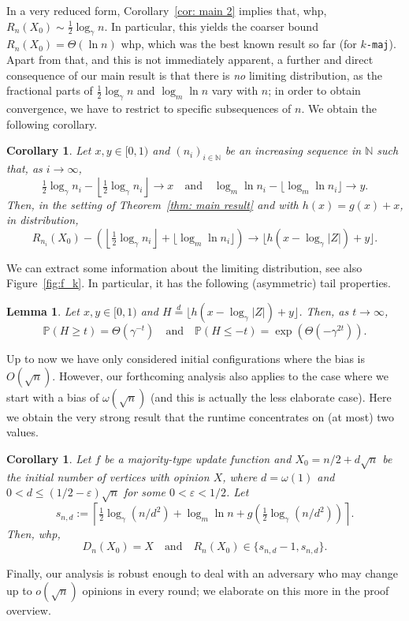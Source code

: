 \documentclass[11pt]{article}
\newcommand{\Prob}{\mathbb{P}}
\numberwithin{theorem}{section}
\newtheorem{corollary}[theorem]{Corollary}
\newtheorem{lemma}[theorem]{Lemma}
\begin{document}
In a very reduced form, Corollary~\ref{cor: main 2} implies that, whp, $R_n(X_0) \sim \frac12\log_\gamma n$.
In particular, this yields the coarser bound $R_n(X_0) =\Theta(\ln n)$ whp, which was the best known result so far (for \texttt{$k$-maj}).
Apart from that, and this is not immediately apparent, a further and direct consequence of our main result is that there is \emph{no} limiting distribution, as the fractional parts of $\frac{1}{2}\log_\gamma n$ and $\log_m\ln n$ vary with $n$;
in order to obtain convergence, we have to restrict to specific subsequences of $n$.
We obtain the following corollary.
\begin{corollary}\label{cor: main 1}
Let $x,y\in[0,1)$ and $(n_i)_{i\in\mathbb{N}}$ be an increasing sequence in $\mathbb{N}$ such that, as $i\to\infty$,
\[
    \tfrac{1}{2}\log_\gamma n_i -\left\lfloor\tfrac{1}{2}\log_\gamma n_i \right\rfloor \to x
    \quad\text{and}\quad
    \log_m\ln n_i - \lfloor\log_m\ln n_i  \rfloor \to y.
\]
Then, in the setting of Theorem~\ref{thm: main result} and with $h(x)=g(x)+x$, in distribution, 
\[
    R_{n_i}(X_0) - \left(\left\lfloor \tfrac{1}{2}\log_\gamma n_i\right\rfloor + \lfloor \log_m\ln n_i\rfloor\right) \to \lfloor h(x-\log_\gamma|Z|) + y\rfloor.
\]
\end{corollary}
We can extract some information about the limiting distribution, see also Figure~\ref{fig:f_k}. In particular, it has the following (asymmetric) tail properties.
\begin{lemma}\label{lem: tails Z}
Let $x,y\in [0,1)$ and $H\stackrel{d}{=}\lfloor h(x-\log_\gamma|Z|) + y\rfloor$. Then, as $t\to \infty$,
\[
    \Prob(H\geq t) = \Theta\left(\gamma^{-t}\right)
    \quad\text{and}\quad 
    \Prob(H\leq -t) = \exp\left(\Theta\left(-\gamma^{2t}\right)\right).
\]
\end{lemma}
Up to now we have only considered initial configurations where the bias is $O(\sqrt{n})$. However, our forthcoming analysis also applies to the case where we start with a bias of $\omega(\sqrt{n})$ (and this is actually the less elaborate case). Here we obtain the very strong result that the runtime concentrates on (at most) two values.
\begin{corollary}\label{cor: concentration for large d} 
Let $f$ be a majority-type update function and  $X_0=n/2 + d\sqrt{n}$ be the initial number of vertices with opinion $X$, where $d = \omega(1)$ and $0<d \le (1/2-\varepsilon)\sqrt{n}$ for some $0<\varepsilon < 1/2$.
Let $$s_{n,d}:=\left\lceil \tfrac{1}{2}\log_\gamma (n/d^2)+\log_m\ln n+g\left(\tfrac{1}{2}\log_\gamma(n/d^2)\right)\right\rceil.$$
Then, whp,
\[
    D_n(X_0) = X
    \quad\text{and}\quad
    R_n(X_0)\in \{s_{n,d}-1, s_{n,d}\}.
\]
\end{corollary}
Finally, our analysis is robust enough to deal with an adversary who may change up to $o(\sqrt{n})$ opinions in every round; we elaborate on this more in the proof overview.
\end{document}
